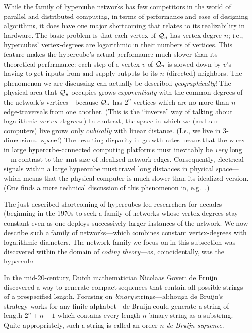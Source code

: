 While the family of hypercube networks has few competitors in the world of parallel and distributed computing, in terms of performance and ease of designing algorithms, it does have one major shortcoming that relates to its realizability in hardware.  The basic problem is that each vertex of $\mbox{$\cal Q$}_n$ has vertex-degree $n$; i.e., hypercubes' vertex-degrees are logarithmic in their numbers of vertices.  This feature makes the hypercube's actual performance much slower than its theoretical performance: each step of a vertex $v$ of $\mbox{$\cal Q$}_n$ is slowed down by $v$'s having to get inputs from and supply outputs to its $n$ (directed) neighbors.  The phenomenon we are discussing can actually be described {\em geographically}!  The physical area that $\mbox{$\cal Q$}_n$ occupies grows {\em exponentially} with the common degrees of the network's vertices---because $\mbox{$\cal Q$}_n$ has $2^n$ vertices which are no more than $n$ edge-traversals from one another.  (This is the ``inverse'' way of talking about logarithmic vertex-degrees.)  In contrast, the space in which we (and our computers) live grows only {\em cubically} with linear distance.  (I.e., we live in $3$-dimensional space!)  The resulting disparity in growth rates means that the wires in large hypercube-connected
computing platforms must inevitably be {\em very} long---in contrast to the unit size of idealized network-edges.  Consequently, electrical signals within a large hypercube must travel long distances in physical space---which means that the physical computer is much slower than its idealized version.  (One finds a more technical discussion of this phenomenon in, e.g., \cite{Ullman84}.)

\smallskip

The just-described shortcoming of hypercubes led researchers for decades (beginning in the 1970s to seek a family of networks whose vertex-degrees stay constant even as one deploys successively larger instances of the network.  We now describe such a family of networks---which combines constant vertex-degrees with logarithmic diameters.  The network family we focus on in this subsection was discovered within the domain of {\it coding theory}---as, coincidentally, was the hypercube.  

\medskip

 

In the mid-20-century, Dutch mathematician Nicolaas Govert de Bruijn discovered a way to generate compact sequences that contain all possible strings of a prespecified length.  Focusing on {\em binary} strings---although de Bruijn's strategy works for any finite alphabet---de Bruijn could generate a string of length $2^n +n-1$ which contains every length-$n$ binary string as a substring.  Quite appropriately, such a string is called an order-$n$ {\it de Bruijn sequence}.

